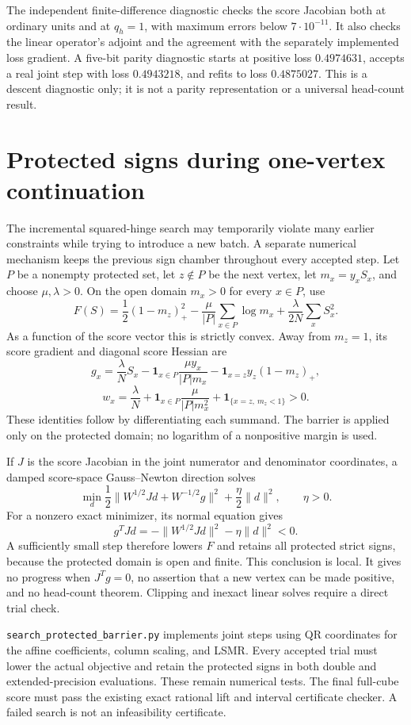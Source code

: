 \documentclass[11pt]{article}
\begin{document}
The independent finite-difference diagnostic checks the score Jacobian
both at ordinary units and at $q_h=1$, with maximum errors below
$7\cdot10^{-11}$. It also checks the linear operator's adjoint and
the agreement with the separately implemented loss gradient. A five-bit
parity diagnostic starts at positive loss $0.4974631$, accepts a real
joint step with loss $0.4943218$, and refits to loss $0.4875027$.
This is a descent diagnostic only; it is not a parity representation
or a universal head-count result.


\section{Protected signs during one-vertex continuation}

The incremental squared-hinge search may temporarily violate many earlier
constraints while trying to introduce a new batch. A separate numerical
mechanism keeps the previous sign chamber throughout every accepted step.
Let $P$ be a nonempty protected set, let $z\notin P$ be the next vertex,
let $m_x=y_xS_x$, and choose $\mu,\lambda>0$. On the open domain
$m_x>0$ for every $x\in P$, use
\[
 F(S)=\frac12(1-m_z)_+^2
      -\frac\mu{|P|}\sum_{x\in P}\log m_x
      +\frac\lambda{2N}\sum_x S_x^2.
\]
As a function of the score vector this is strictly convex. Away from
$m_z=1$, its score gradient and diagonal score Hessian are
\[
 g_x=\frac\lambda N S_x
     -\mathbf1_{x\in P}\frac{\mu y_x}{|P|m_x}
     -\mathbf1_{x=z}y_z(1-m_z)_+,
\]
\[
 w_x=\frac\lambda N
     +\mathbf1_{x\in P}\frac\mu{|P|m_x^2}
     +\mathbf1_{\{x=z,\ m_z<1\}}>0.
\]
These identities follow by differentiating each summand. The barrier
is applied only on the protected domain; no logarithm of a nonpositive
margin is used.

If $J$ is the score Jacobian in the joint numerator and denominator
coordinates, a damped score-space Gauss--Newton direction solves
\[
 \min_d\frac12\|W^{1/2}Jd+W^{-1/2}g\|^2
             +\frac\eta2\|d\|^2,\qquad\eta>0.
\]
For a nonzero exact minimizer, its normal equation gives
\[
 g^TJd=-\|W^{1/2}Jd\|^2-\eta\|d\|^2<0.
\]
A sufficiently small step therefore lowers $F$ and retains all protected
strict signs, because the protected domain is open and finite. This
conclusion is local. It gives no progress when $J^Tg=0$, no assertion
that a new vertex can be made positive, and no head-count theorem.
Clipping and inexact linear solves require a direct trial check.

\texttt{search\_protected\_barrier.py} implements joint steps using
QR coordinates for the affine coefficients, column scaling, and LSMR.
Every accepted trial must lower the actual objective and retain the
protected signs in both double and extended-precision evaluations.
These remain numerical tests. The final full-cube score must pass the
existing exact rational lift and interval certificate checker. A failed
search is not an infeasibility certificate.
\end{document}
